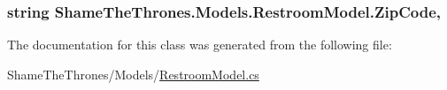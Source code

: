 \subsubsection[{\texorpdfstring{Zip\+Code}{ZipCode}}]{\setlength{\rightskip}{0pt plus 5cm}string Shame\+The\+Thrones.\+Models.\+Restroom\+Model.\+Zip\+Code\hspace{0.3cm}{\ttfamily [get]}, {\ttfamily [set]}}\hypertarget{class_shame_the_thrones_1_1_models_1_1_restroom_model_a4aee96f9372eca583bb633f2918265b4}{}\label{class_shame_the_thrones_1_1_models_1_1_restroom_model_a4aee96f9372eca583bb633f2918265b4}


The documentation for this class was generated from the following file\+:\begin{DoxyCompactItemize}
\item 
Shame\+The\+Thrones/\+Models/\hyperlink{_restroom_model_8cs}{Restroom\+Model.\+cs}\end{DoxyCompactItemize}
